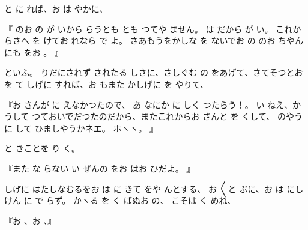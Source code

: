 と
に
れば、お
は
やかに、

『
のお
の
が
いから
らうとも
とも
つてや
ません。
は
だから
が
い。
これからさへ
を
けてお
れなら
で
よ。
さあもうをかしな
を
ないでお
の
のお
ちやんにも
をお
。
』

といふ。
りだにされず
されたる
しさに、さしぐむ
の
をあげて、さてそつとお
を
て
しげに
すれば、お
もまた
かしげに
を
やりて、

『お
さんが
に
えなかつたので、
あ
なにか
に
しく
つたらう！。
い
ねえ、かうして
つておいでだつたのだから、またこれからお
さんと
を
くして、
のやうに
して
ひましやうかネエ。
ホヽヽ。
』

と
きことを
り
く。

『また
な
らない
い
ぜんの
をお
はお
ひだよ。
』

しげに
はたしなむるをお
は
に
きて
をや
んとする、
お
〳〵と
ぶに、お
は
にしけん
に
で
らず。
かヽる
を
く
ばぬお
の、
こそは
く
めね、

『お
、お
、』

